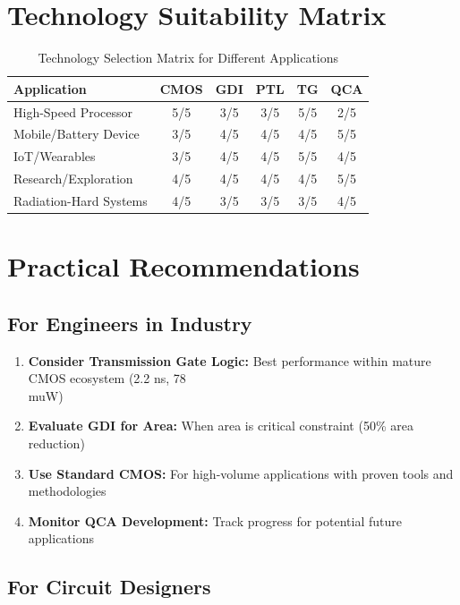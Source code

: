 \documentclass[12pt,a4paper,twoside]{report}
\begin{document}
\section{Technology Suitability Matrix}

\begin{table}[H]
\centering
\caption{Technology Selection Matrix for Different Applications}
\label{tab:selection_matrix}
\begin{tabularx}{\textwidth}{lccccc}
\toprule
Application & CMOS & GDI & PTL & TG & QCA \\
\midrule
High-Speed Processor & 5/5 & 3/5 & 3/5 & 5/5 & 2/5 \\
Mobile/Battery Device & 3/5 & 4/5 & 4/5 & 4/5 & 5/5 \\
IoT/Wearables & 3/5 & 4/5 & 4/5 & 5/5 & 4/5 \\
Research/Exploration & 4/5 & 4/5 & 4/5 & 4/5 & 5/5 \\
Radiation-Hard Systems & 4/5 & 3/5 & 3/5 & 3/5 & 4/5 \\
\bottomrule
\end{tabularx}
\end{table}

\section{Practical Recommendations}

\subsection{For Engineers in Industry}

\begin{enumerate}
    \item \textbf{Consider Transmission Gate Logic:} Best performance within mature CMOS ecosystem (2.2 ns, 78 \\muW)
    \item \textbf{Evaluate GDI for Area:} When area is critical constraint (50\% area reduction)
    \item \textbf{Use Standard CMOS:} For high-volume applications with proven tools and methodologies
    \item \textbf{Monitor QCA Development:} Track progress for potential future applications
\end{enumerate}

\subsection{For Circuit Designers}
\end{document}
